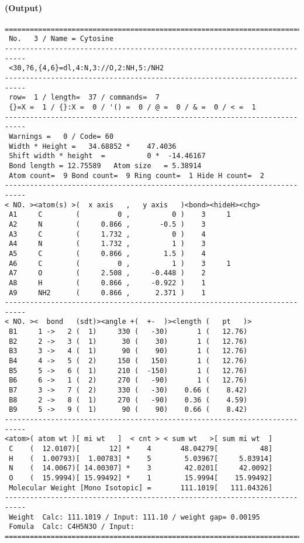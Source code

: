 \documentclass[a4paper]{article}
\begin{document}
\paragraph{(Output)}
\begin{verbatim}
===========================================================================
 No.   3 / Name = Cytosine
---------------------------------------------------------------------------
 <30,?6,{4,6}=dl,4:N,3://O,2:NH,5:/NH2
---------------------------------------------------------------------------
 row=  1 / length=  37 / commands=  7
 {}=X =  1 / {}:X =  0 / '() =  0 / @ =  0 / & =  0 / < =  1
---------------------------------------------------------------------------
 Warnings =   0 / Code= 60
 Width * Height =   34.68852 *    47.4036
 Shift width * height  =          0 *  -14.46167
 Bond length = 12.75589   Atom size   = 5.38914
 Atom count=  9 Bond count=  9 Ring count=  1 Hide H count=  2
---------------------------------------------------------------------------
< NO. ><atom(s) >(  x axis   ,   y axis   )<bond><hideH><chg>
 A1     C        (         0 ,          0 )    3     1
 A2     N        (     0.866 ,       -0.5 )    3        
 A3     C        (     1.732 ,          0 )    4        
 A4     N        (     1.732 ,          1 )    3        
 A5     C        (     0.866 ,        1.5 )    4        
 A6     C        (         0 ,          1 )    3     1
 A7     O        (     2.508 ,     -0.448 )    2        
 A8     H        (     0.866 ,     -0.922 )    1        
 A9     NH2      (     0.866 ,      2.371 )    1        
---------------------------------------------------------------------------
< NO. ><  bond   (sdt)><angle +(  +-  )><length (   pt   )>
 B1     1 ->   2 (  1)     330 (   -30)       1 (   12.76)
 B2     2 ->   3 (  1)      30 (    30)       1 (   12.76)
 B3     3 ->   4 (  1)      90 (    90)       1 (   12.76)
 B4     4 ->   5 (  2)     150 (   150)       1 (   12.76)
 B5     5 ->   6 (  1)     210 (  -150)       1 (   12.76)
 B6     6 ->   1 (  2)     270 (   -90)       1 (   12.76)
 B7     3 ->   7 (  2)     330 (   -30)    0.66 (    8.42)
 B8     2 ->   8 (  1)     270 (   -90)    0.36 (    4.59)
 B9     5 ->   9 (  1)      90 (    90)    0.66 (    8.42)
---------------------------------------------------------------------------
<atom>( atom wt )[ mi wt   ]  < cnt > < sum wt   >[ sum mi wt  ]
 C    (  12.0107)[       12] *    4       48.04279[          48]
 H    (  1.00793)[  1.00783] *    5        5.03967[     5.03914]
 N    (  14.0067)[ 14.00307] *    3        42.0201[     42.0092]
 O    (  15.9994)[ 15.99492] *    1        15.9994[    15.99492]
 Molecular Weight [Mono Isotopic] =       111.1019[   111.04326]
---------------------------------------------------------------------------
 Weight  Calc: 111.1019 / Input: 111.10 / weight gap= 0.00195
 Fomula  Calc: C4H5N3O / Input: 
===========================================================================
\end{verbatim}%
\newpage
\noindent%
\end{document}

